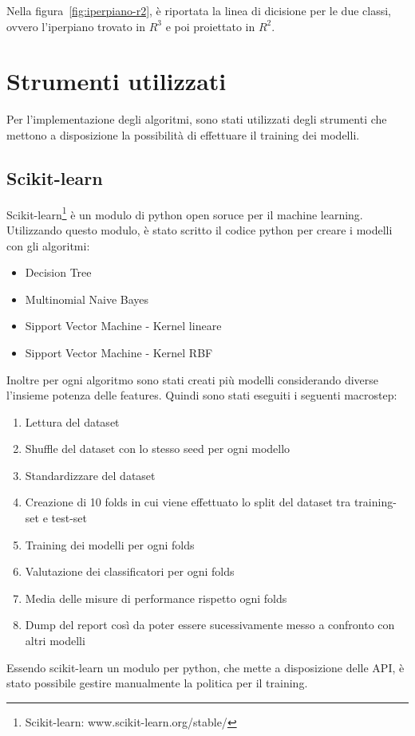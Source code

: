 \documentclass[oneside]{book}
\begin{document}
\noindent
Nella figura~\ref{fig:iperpiano-r2}, è riportata la linea di dicisione per le due classi, ovvero l'iperpiano trovato in $R^3$ e poi proiettato in $R^2$.

\section{Strumenti utilizzati}
Per l'implementazione degli algoritmi, sono stati utilizzati degli strumenti che mettono a disposizione la possibilità di effettuare il training dei modelli.

\subsection{Scikit-learn}
Scikit-learn\footnote{Scikit-learn: www.scikit-learn.org/stable/} è un modulo di python open soruce per il machine learning. Utilizzando questo modulo, è stato scritto il codice python per creare i modelli con gli algoritmi:
\begin{itemize}
	\item Decision Tree
	\item Multinomial Naive Bayes
	\item Sipport Vector Machine - Kernel lineare
	\item Sipport Vector Machine - Kernel RBF
\end{itemize}
Inoltre per ogni algoritmo sono stati creati più modelli considerando diverse l'insieme potenza delle features. Quindi sono stati eseguiti i seguenti macrostep:
\begin{enumerate}
	\item Lettura del dataset
	\item Shuffle del dataset con lo stesso seed per ogni modello
	\item Standardizzare del dataset
	\item Creazione di 10 folds in cui viene effettuato lo split del dataset tra training-set e test-set
	\item Training dei modelli per ogni folds
	\item Valutazione dei classificatori per ogni folds
	\item Media delle misure di performance rispetto ogni folds
	\item Dump del report così da poter essere sucessivamente messo a confronto con altri modelli
\end{enumerate}
Essendo scikit-learn un modulo per python, che mette a disposizione delle API, è stato possibile gestire manualmente la politica per il training.
\end{document}
